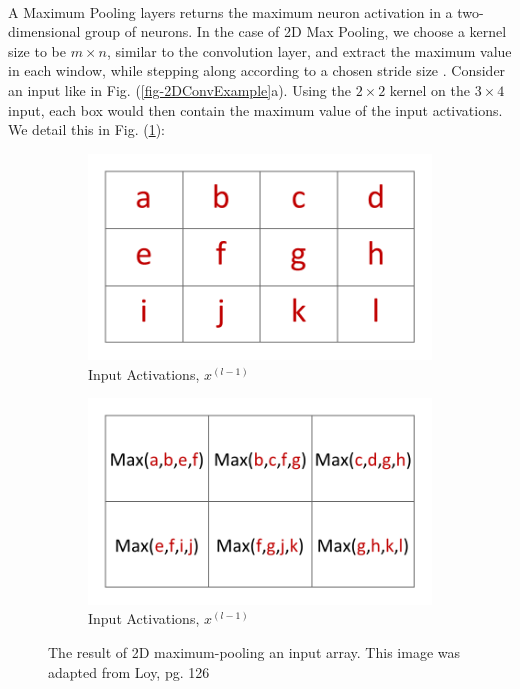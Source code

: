 \documentclass[12pt,letterpaper]{article}
\begin{document}
\paragraph*{}A Maximum Pooling layers returns the maximum neuron activation in a two-dimensional group of neurons. In the case of 2D Max Pooling, we choose a kernel size to be $m \times n$, similar to the convolution layer, and extract the maximum value in each window, while stepping along according to a chosen stride size \cite{Loy,Goodfellow}. Consider an input like in Fig. (\ref{fig-2DConvExample}a). Using the $2 \times 2$ kernel on the $3 \times 4$ input, each box would then contain the maximum value of the input activations. We detail this in Fig. (\ref{fig-2DMaxPool}):
\begin{figure}[H]
	\begin{subfigure}{0.45\textwidth}
	\includegraphics[scale=0.6]{../figures/2DConvExample(a)}
	\caption{Input Activations, $x^{(l-1)}$}
	\end{subfigure}
	\begin{subfigure}{0.45\textwidth}
	\includegraphics[scale=0.6]{../figures/2DConvExample(d)}
	\caption{Input Activations, $x^{(l-1)}$}
	\end{subfigure}
\caption{The result of 2D maximum-pooling an input array. This image was adapted from Loy, pg. 126 \cite{Loy}}
\label{fig-2DMaxPool}
\end{figure} 
\end{document}
